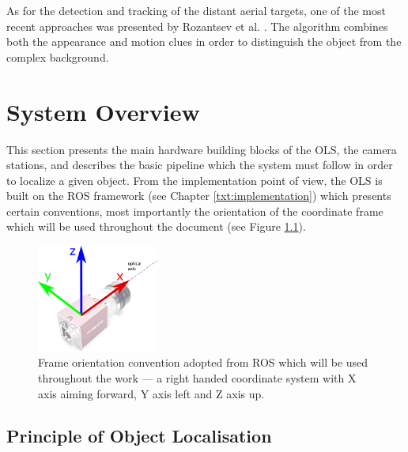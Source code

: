 As for the detection and tracking of the distant aerial targets, one of the most recent approaches was presented by Rozantsev et al. \cite{DBLP:journals/corr/RozantsevLF14}. The algorithm combines both the appearance and motion clues in order to distinguish the object from the complex background.


\chapter{System Overview} \label{txt:system_overview}

This section presents the main hardware building blocks of the OLS, the camera stations, and describes the basic pipeline which the system must follow in order to localize a given object. From the implementation point of view, the OLS is built on the ROS framework (see Chapter \ref{txt:implementation}) which presents certain conventions, most importantly the orientation of the coordinate frame which will be used throughout the document (see Figure \ref{fig:frame_convention}).

\begin{figure}[htb]
	\centering
	\includegraphics[width=4cm]{fig/frame_convention.pdf}
	\caption{Frame orientation convention adopted from ROS which will be used throughout the work --- a right handed coordinate system with X axis aiming forward, Y axis left and Z axis up.}
	\label{fig:frame_convention}
\end{figure}

\section{Principle of Object Localisation}

